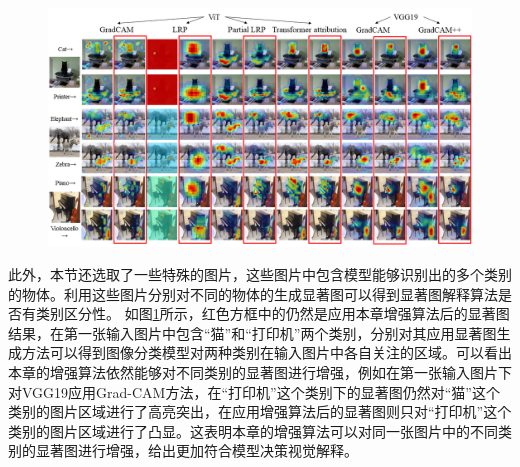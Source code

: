 \begin{figure}[!ht]
	\centering 
	\includegraphics[width=15cm]{fig/ch4/classSensitive.png}
	\label{fig:classSensitive}
\end{figure}

此外，本节还选取了一些特殊的图片，这些图片中包含模型能够识别出的多个类别的物体。利用这些图片分别对不同的物体的生成显著图可以得到显著图解释算法是否有类别区分性。 如图\ref{fig:classSensitive}所示，红色方框中的仍然是应用本章增强算法后的显著图结果，在第一张输入图片中包含“猫”和“打印机”两个类别，分别对其应用显著图生成方法可以得到图像分类模型对两种类别在输入图片中各自关注的区域。可以看出本章的增强算法依然能够对不同类别的显著图进行增强，例如在第一张输入图片下对VGG19应用Grad-CAM方法，在“打印机”这个类别下的显著图仍然对“猫”这个类别的图片区域进行了高亮突出，在应用增强算法后的显著图则只对“打印机”这个类别的图片区域进行了凸显。这表明本章的增强算法可以对同一张图片中的不同类别的显著图进行增强，给出更加符合模型决策视觉解释。


